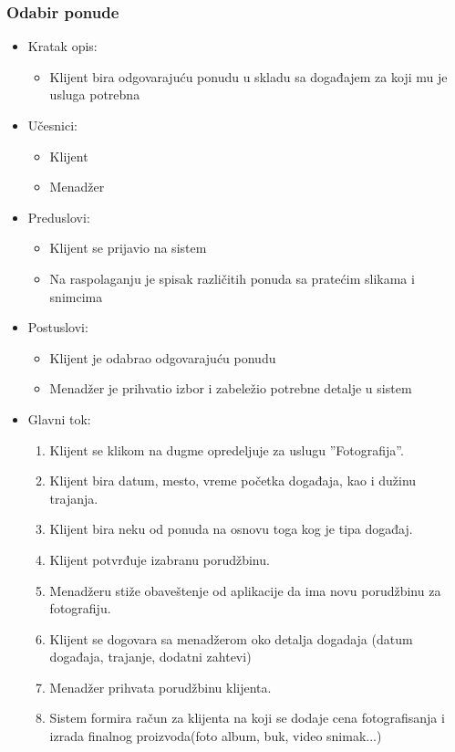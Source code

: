 \documentclass[a4paper]{article}
\begin{document}
\subsubsection{Odabir ponude}
\begin{itemize}
    \item Kratak opis: 
    \begin{itemize}
        \item Klijent bira odgovarajuću ponudu u skladu sa događajem za koji mu je usluga potrebna
    \end{itemize}
    \item Učesnici:
        \begin{itemize}
        \item Klijent
        \item Menadžer
    \end{itemize}
    \item Preduslovi:
        \begin{itemize}
            \item Klijent se prijavio na sistem
            \item Na raspolaganju je spisak različitih ponuda sa pratećim slikama i snimcima
        \end{itemize}
    \item Postuslovi:
        \begin{itemize}
            \item Klijent je odabrao odgovarajuću ponudu
            \item Menadžer je prihvatio izbor i zabeležio potrebne detalje u sistem
        \end{itemize}
    \item Glavni tok:
        \begin{enumerate}
            \item Klijent se klikom na dugme opredeljuje za uslugu ''Fotografija''.
            \item Klijent bira datum, mesto, vreme početka događaja, kao i dužinu trajanja.
            \item Klijent bira neku od ponuda na osnovu toga kog je tipa događaj.
            \item Klijent potvrđuje izabranu porudžbinu.
            \item Menadžeru stiže obaveštenje od aplikacije da ima novu porudžbinu za fotografiju.
            \item Klijent se dogovara sa menadžerom oko detalja dogadaja (datum događaja, trajanje, dodatni zahtevi)
            \item Menadžer prihvata porudžbinu klijenta.
            \item Sistem formira račun za klijenta na koji se dodaje cena fotografisanja i izrada finalnog proizvoda(foto album, buk, video snimak...)
        \end{enumerate}
        

\end{itemize}
\end{document}
